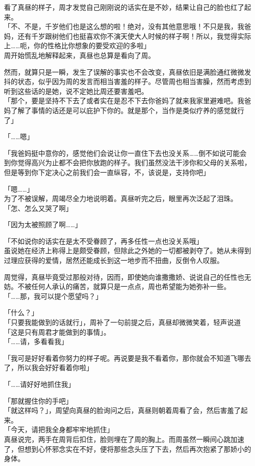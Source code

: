 看了真昼的样子，周才发觉自己刚刚说的话实在是不妙，结果让自己的脸也红了起来。\\

「不、不是，千岁他们也是这么想的啦！绝对，没有其他意思哦！不只是我，我爸妈，还有千岁跟树他们也挺喜欢你不演天使大人时候的样子啊！所以，我觉得实际上……呃，你的性格比你想象的要受欢迎的多啦」\\

周开始慌乱地解释起来，真昼也总算是看向了周。

然而，就算只是一瞬，发生了误解的事实也不会改变，真昼依旧是满脸通红微微发抖的状态，似乎因为周的发言而相当害羞的样子。尽管周也相当害臊，然而考虑到听到这些话的是她，说不定她比周还要害羞吧。\\

「那个，要是坚持不下去了或者实在是忍不下去你爸妈了就来我家里避难吧。我爸妈了解了事情的话还是可以庇护下你的。就是那个，当作是类似疗养的感觉就行了」

「……嗯」

「我爸妈挺中意你的，感觉他们会说让你一直住下去也没关系……倒不如说可能会到你觉得高兴为止都不会把你放跑的样子。我们虽然没法干涉你和父母的关系啦，但是等到你下定决心之前我们会一直纵容，不，该说是，支持你吧」

「嗯……」\\

为了不被误解，周竭尽全力地说明着。真昼听完之后，眼里再次泛起了泪珠。\\

「怎、怎么又哭了啊」

「因为太被照顾了啊……」

「不如说你的话实在是太不受眷顾了，再多任性一点也没关系哦」\\

虽说她在经济上称得上是颇受眷顾，但除此之外她的一切都被剥夺了。她从未得到过理应获得的爱情，居然还能成长到这一地步而不扭曲，反倒令人叹服。

周觉得，真昼毕竟受过那般对待，因而，即使她向谁撒撒娇、说说自己的任性也无妨。不被任何人承认的痛苦，就算只是一点点，周也希望能为她弥补一些。\\

「……那，我可以提个愿望吗？」

「什么？」\\

「只要我能做到的话就行」，周补了一句前提之后，真昼却微微笑着，轻声说道「这是只有周君才能做到的事情」。\\

「……请，多看看我」

「我可是好好看着你努力的样子呢。再说要是我不看着你，那你就会不知道飞哪去了，所以我会好好看着你啦」

「……请好好地抓住我」

「那就握住你的手吧」\\

「就这样吗？」，周望向真昼的脸询问之后，真昼则朝着周看了会，然后害羞了起来。\\

「今天，请把我全身都牢牢地抓住」\\

真昼说完，两手在周背后扣住，脸则埋在了周的胸上。而周虽然一瞬间心跳加速了，但想到心怀邪念实在不好，便将那些念头压了下去，然后再次抱紧了那娇小的身体。
